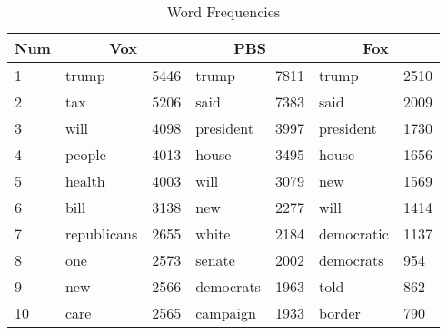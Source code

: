 \begin{table}[H]
    \centering
    \caption{Word Frequencies}
    \label{tab:1gram}
    \begin{tabular}{l|ll|ll|ll} \hline
    Num & \multicolumn{2}{c|}{Vox} & \multicolumn{2}{c|}{PBS} & \multicolumn{2}{c}{Fox} \\ \hline \hline
    1   & trump       & 5446 & trump     & 7811 & trump      & 2510 \\
    2   & tax         & 5206 & said      & 7383 & said       & 2009 \\
    3   & will        & 4098 & president & 3997 & president  & 1730 \\
    4   & people      & 4013 & house     & 3495 & house      & 1656 \\
    5   & health      & 4003 & will      & 3079 & new        & 1569 \\
    6   & bill        & 3138 & new       & 2277 & will       & 1414 \\
    7   & republicans & 2655 & white     & 2184 & democratic & 1137 \\
    8   & one         & 2573 & senate    & 2002 & democrats  & 954  \\
    9   & new         & 2566 & democrats & 1963 & told       & 862  \\
    10  & care        & 2565 & campaign  & 1933 & border     & 790 \\ \hline
    \end{tabular}
\end{table}